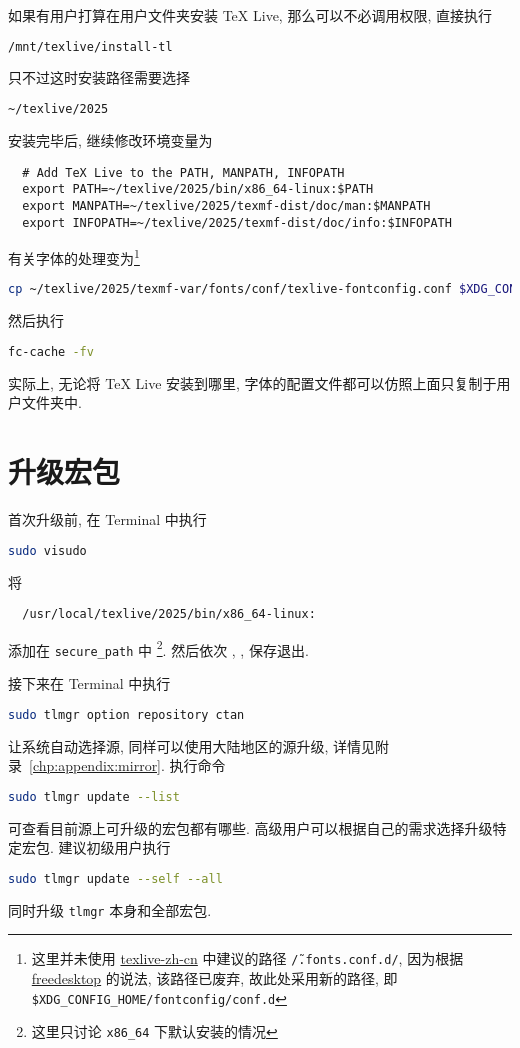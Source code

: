如果有用户打算在用户文件夹安装 \TeX{} Live,
那么可以不必调用权限,
直接执行
\begin{lstlisting}[language=bash]
  /mnt/texlive/install-tl
\end{lstlisting}
只不过这时安装路径需要选择
\begin{lstlisting}[language=bash]
  ~/texlive/2025
\end{lstlisting}
安装完毕后,
继续修改环境变量为
\begin{lstlisting}
  # Add TeX Live to the PATH, MANPATH, INFOPATH
  export PATH=~/texlive/2025/bin/x86_64-linux:$PATH
  export MANPATH=~/texlive/2025/texmf-dist/doc/man:$MANPATH
  export INFOPATH=~/texlive/2025/texmf-dist/doc/info:$INFOPATH
\end{lstlisting}
有关字体的处理变为\footnote{这里并未使用 \href{https://tug.org/texlive/doc/texlive-zh-cn/texlive-zh-cn.pdf}{texlive-zh-cn} 中建议的路径 \texttt{\~/.fonts.conf.d/},
因为根据 \href{https://www.freedesktop.org/software/fontconfig/fontconfig-user.html}{freedesktop} 的说法,
该路径已废弃,
故此处采用新的路径,
即 \texttt{\$XDG\_CONFIG\_HOME/fontconfig/conf.d}}
\begin{lstlisting}[language=bash]
  cp ~/texlive/2025/texmf-var/fonts/conf/texlive-fontconfig.conf $XDG_CONFIG_HOME/fontconfig/conf.d/09-texlive.conf
\end{lstlisting}
然后执行
\begin{lstlisting}[language=bash]
  fc-cache -fv
\end{lstlisting}
实际上,
无论将 \TeX{} Live 安装到哪里,
字体的配置文件都可以仿照上面只复制于用户文件夹中.

\section{升级宏包}\label{sec:ubuntu:update}

首次升级前,
在 \textsf{Terminal} 中执行
\begin{lstlisting}[language = bash]
  sudo visudo
\end{lstlisting}
将
\begin{lstlisting}
  /usr/local/texlive/2025/bin/x86_64-linux:
\end{lstlisting}
添加在 \texttt{secure\_path} 中%
\footnote{这里只讨论 \texttt{x86\_64} 下默认安装的情况}.
然后依次 , , \keys{\enter} 保存退出.

接下来在 \textsf{Terminal} 中执行
\begin{lstlisting}[language = bash]
  sudo tlmgr option repository ctan
\end{lstlisting}
让系统自动选择源,
同样可以使用大陆地区的源升级,
详情见附录~\ref{chp:appendix:mirror}.
执行命令
\begin{lstlisting}[language = bash]
  sudo tlmgr update --list
\end{lstlisting}
可查看目前源上可升级的宏包都有哪些. 
高级用户可以根据自己的需求选择升级特定宏包.
建议初级用户执行
\begin{lstlisting}[language = bash]
  sudo tlmgr update --self --all
\end{lstlisting}
同时升级 \texttt{tlmgr} 本身和全部宏包. 

